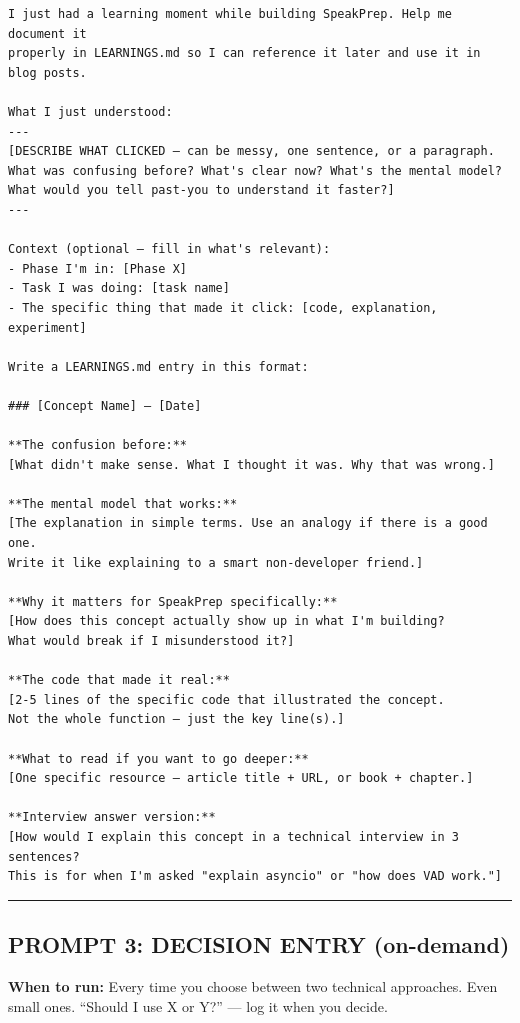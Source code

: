 \documentclass[
  11pt,
]{article}
\begin{document}
\begin{lstlisting}
I just had a learning moment while building SpeakPrep. Help me document it
properly in LEARNINGS.md so I can reference it later and use it in blog posts.

What I just understood:
---
[DESCRIBE WHAT CLICKED — can be messy, one sentence, or a paragraph.
What was confusing before? What's clear now? What's the mental model?
What would you tell past-you to understand it faster?]
---

Context (optional — fill in what's relevant):
- Phase I'm in: [Phase X]
- Task I was doing: [task name]
- The specific thing that made it click: [code, explanation, experiment]

Write a LEARNINGS.md entry in this format:

### [Concept Name] — [Date]

**The confusion before:**
[What didn't make sense. What I thought it was. Why that was wrong.]

**The mental model that works:**
[The explanation in simple terms. Use an analogy if there is a good one.
Write it like explaining to a smart non-developer friend.]

**Why it matters for SpeakPrep specifically:**
[How does this concept actually show up in what I'm building?
What would break if I misunderstood it?]

**The code that made it real:**
[2-5 lines of the specific code that illustrated the concept.
Not the whole function — just the key line(s).]

**What to read if you want to go deeper:**
[One specific resource — article title + URL, or book + chapter.]

**Interview answer version:**
[How would I explain this concept in a technical interview in 3 sentences?
This is for when I'm asked "explain asyncio" or "how does VAD work."]
\end{lstlisting}

\begin{center}\rule{0.5\linewidth}{0.5pt}\end{center}

\hypertarget{prompt-3-decision-entry-on-demand}{%
\subsection{PROMPT 3: DECISION ENTRY
(on-demand)}\label{prompt-3-decision-entry-on-demand}}

\textbf{When to run:} Every time you choose between two technical
approaches. Even small ones. ``Should I use X or Y?'' --- log it when
you decide.
\end{document}
